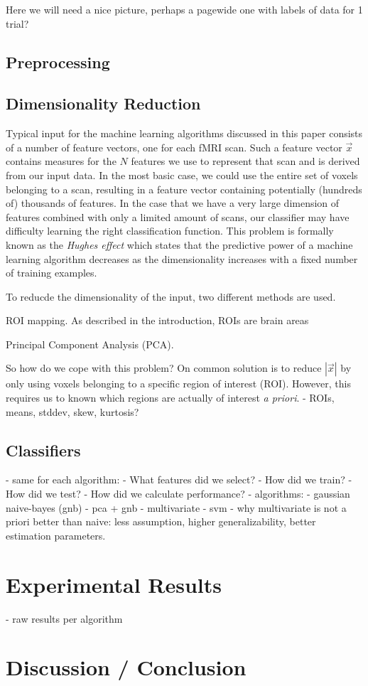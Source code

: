 \documentclass[preprint,journal,11pt]{vgtc}
\begin{document}
Here we will need a nice picture, perhaps a pagewide one with labels of data for 1 trial?

\subsection{Preprocessing}

\subsection{Dimensionality Reduction}
Typical input for the machine learning algorithms discussed in this paper consists of a number of feature vectors, one for each fMRI scan. Such a feature vector $\vec{x}$ contains measures for the $N$ features we use to represent that scan and is derived from our input data. In the most basic case, we could use the entire set of voxels belonging to a scan, resulting in a feature vector containing potentially (hundreds of) thousands of features.
In the case that we have a very large dimension of features combined with only a limited amount of scans, our classifier may have difficulty learning the right classification function. This problem is formally known as the \textit{Hughes effect}\cite{Hughes1054102} which states that the predictive power of a machine learning algorithm decreases as the dimensionality increases with a fixed number of training examples.

To reducde the dimensionality of the input, two different methods are used.

ROI mapping. As described in the introduction, ROIs are brain areas 

Principal Component Analysis (PCA).


So how do we cope with this problem? On common solution is to reduce $|\vec{x}|$ by only using voxels belonging to a specific region of interest (ROI). However, this requires us to known which regions are actually of interest \textit{a priori}.
- ROIs, means, stddev, skew, kurtosis?

\subsection{Classifiers}



- same for each algorithm:
    - What features did we select?
    - How did we train?
    - How did we test?
        - How did we calculate performance?
- algorithms:
    - gaussian naive-bayes (gnb)
        - pca + gnb
    - multivariate
    - svm
    - why multivariate is not a priori better than naive: less assumption, higher generalizability, better estimation parameters. 



\section{Experimental Results}
\label{sec:results}
- raw results per algorithm

\section{Discussion / Conclusion}
\label{sec:discussion}


\nocite{*}

\end{document}
